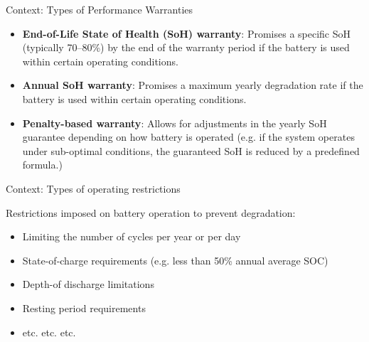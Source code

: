 \documentclass{beamer}
\begin{document}
\begin{frame}{Context: Types of Performance Warranties}

\begin{itemize}
    \item  \textbf{End-of-Life State of Health (SoH) warranty}: Promises a specific SoH (typically 70–80\%) by the end of the warranty period if the battery is used within certain operating conditions.
    \item \textbf{Annual SoH warranty}: Promises a maximum yearly degradation rate if the battery is used within certain operating conditions.
    \item \textbf{Penalty-based warranty}: Allows for adjustments in the yearly SoH guarantee depending on how battery is operated (e.g. if the system operates under sub-optimal conditions, the guaranteed SoH is reduced by a predefined formula.)
\end{itemize}

\end{frame}

\begin{frame}{Context: Types of operating restrictions}

Restrictions imposed on battery operation to prevent degradation:
    \begin{itemize}
        \item Limiting the number of cycles per year or per day 
        \item State-of-charge requirements (e.g. less than 50\% annual average SOC)
        \item Depth-of discharge limitations
        \item Resting period requirements
        \item etc. etc. etc.
    \end{itemize}

   
\end{frame}
\end{document}
